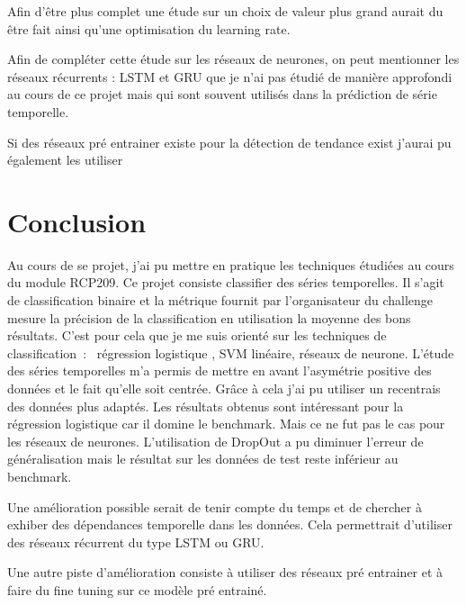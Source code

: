 \documentclass[12pt]{scrartcl} %
\begin{document}
Afin d'être plus complet une étude sur un choix de valeur plus grand aurait du être fait ainsi qu'une optimisation du learning rate.



Afin de compléter cette étude sur les réseaux de neurones, on peut mentionner les réseaux récurrents : LSTM et GRU que je n'ai pas étudié de manière approfondi au cours de ce projet mais qui sont souvent utilisés dans la prédiction de série temporelle.

Si des réseaux pré entrainer existe pour la détection de tendance exist j'aurai pu également les utiliser
\section{Conclusion}
Au cours de se projet, j'ai pu mettre en pratique les techniques étudiées au cours du module RCP209. Ce projet consiste classifier des séries temporelles. Il s'agit de classification binaire et la métrique fournit par l'organisateur du challenge mesure la précision de la classification en utilisation  la moyenne des bons résultats. C'est pour cela que je me suis orienté sur les techniques de classification~: ~régression logistique , SVM linéaire, réseaux de neurone. L'étude des séries temporelles m'a permis de mettre en avant l'asymétrie positive des données et le fait qu'elle soit centrée. Grâce à cela j'ai pu utiliser un recentrais des données plus adaptés. Les résultats obtenus sont intéressant pour la régression logistique car il domine le benchmark. Mais ce ne fut pas le cas pour les réseaux de neurones. L'utilisation de DropOut a pu diminuer l'erreur de généralisation mais le résultat sur les données de test reste inférieur au benchmark.



Une amélioration possible serait de tenir compte du temps et de chercher à exhiber des dépendances temporelle dans les données. Cela permettrait d'utiliser des réseaux récurrent du type LSTM ou GRU.


Une autre piste d'amélioration consiste à utiliser des réseaux pré entrainer et à faire du fine tuning sur ce modèle pré entrainé.
\end{document}
